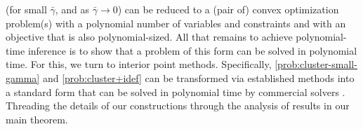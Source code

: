\documentclass{article}
\newcommand\zogamma{{\bar\gamma}}
\begin{document}
(for small $\zogamma$, and as $\zogamma \to 0$)
%
can be reduced to a (pair of) convex optimization problem(s) with a
polynomial number of variables and constraints and with an objective that is also polynomial-sized.
All that remains to achieve polynomial-time inference is to show that a problem of this form can be solved in polynomial time.
For this, we turn to interior point methods.
Specifically, \eqref{prob:cluster-small-gamma} and \eqref{prob:cluster+idef} can be transformed via established methods \parencite{agrawal2018rewriting} into
a standard form
that
can be solved in polynomial time by commercial solvers \parencite{mosek,ECOS}.
Threading the details of our constructions
through the analysis of
\textcite{dahl2022primal}
results in our main theorem.


\end{document}
